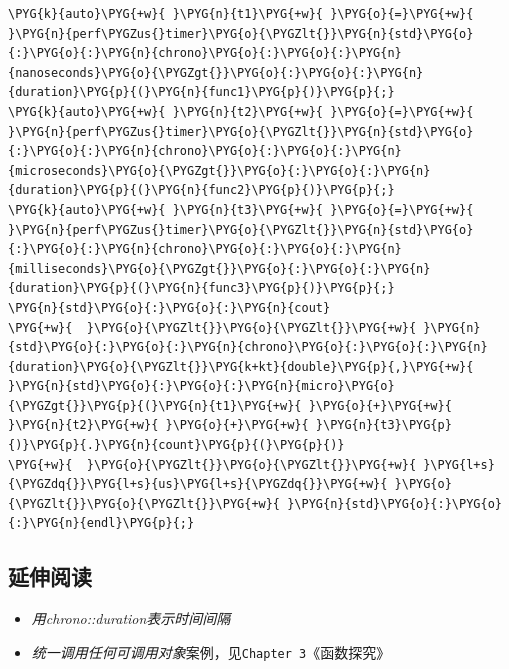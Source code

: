 \begin{codeblockbg}
\begin{Verbatim}[commandchars=\\\{\},breaklines=true,breakanywhere=true,fontsize=\codefont,xleftmargin=17bp]
\PYG{k}{auto}\PYG{+w}{ }\PYG{n}{t1}\PYG{+w}{ }\PYG{o}{=}\PYG{+w}{ }\PYG{n}{perf\PYGZus{}timer}\PYG{o}{\PYGZlt{}}\PYG{n}{std}\PYG{o}{:}\PYG{o}{:}\PYG{n}{chrono}\PYG{o}{:}\PYG{o}{:}\PYG{n}{nanoseconds}\PYG{o}{\PYGZgt{}}\PYG{o}{:}\PYG{o}{:}\PYG{n}{duration}\PYG{p}{(}\PYG{n}{func1}\PYG{p}{)}\PYG{p}{;}
\PYG{k}{auto}\PYG{+w}{ }\PYG{n}{t2}\PYG{+w}{ }\PYG{o}{=}\PYG{+w}{ }\PYG{n}{perf\PYGZus{}timer}\PYG{o}{\PYGZlt{}}\PYG{n}{std}\PYG{o}{:}\PYG{o}{:}\PYG{n}{chrono}\PYG{o}{:}\PYG{o}{:}\PYG{n}{microseconds}\PYG{o}{\PYGZgt{}}\PYG{o}{:}\PYG{o}{:}\PYG{n}{duration}\PYG{p}{(}\PYG{n}{func2}\PYG{p}{)}\PYG{p}{;}
\PYG{k}{auto}\PYG{+w}{ }\PYG{n}{t3}\PYG{+w}{ }\PYG{o}{=}\PYG{+w}{ }\PYG{n}{perf\PYGZus{}timer}\PYG{o}{\PYGZlt{}}\PYG{n}{std}\PYG{o}{:}\PYG{o}{:}\PYG{n}{chrono}\PYG{o}{:}\PYG{o}{:}\PYG{n}{milliseconds}\PYG{o}{\PYGZgt{}}\PYG{o}{:}\PYG{o}{:}\PYG{n}{duration}\PYG{p}{(}\PYG{n}{func3}\PYG{p}{)}\PYG{p}{;}
\PYG{n}{std}\PYG{o}{:}\PYG{o}{:}\PYG{n}{cout}
\PYG{+w}{  }\PYG{o}{\PYGZlt{}}\PYG{o}{\PYGZlt{}}\PYG{+w}{ }\PYG{n}{std}\PYG{o}{:}\PYG{o}{:}\PYG{n}{chrono}\PYG{o}{:}\PYG{o}{:}\PYG{n}{duration}\PYG{o}{\PYGZlt{}}\PYG{k+kt}{double}\PYG{p}{,}\PYG{+w}{ }\PYG{n}{std}\PYG{o}{:}\PYG{o}{:}\PYG{n}{micro}\PYG{o}{\PYGZgt{}}\PYG{p}{(}\PYG{n}{t1}\PYG{+w}{ }\PYG{o}{+}\PYG{+w}{ }\PYG{n}{t2}\PYG{+w}{ }\PYG{o}{+}\PYG{+w}{ }\PYG{n}{t3}\PYG{p}{)}\PYG{p}{.}\PYG{n}{count}\PYG{p}{(}\PYG{p}{)}
\PYG{+w}{  }\PYG{o}{\PYGZlt{}}\PYG{o}{\PYGZlt{}}\PYG{+w}{ }\PYG{l+s}{\PYGZdq{}}\PYG{l+s}{us}\PYG{l+s}{\PYGZdq{}}\PYG{+w}{ }\PYG{o}{\PYGZlt{}}\PYG{o}{\PYGZlt{}}\PYG{+w}{ }\PYG{n}{std}\PYG{o}{:}\PYG{o}{:}\PYG{n}{endl}\PYG{p}{;}
\end{Verbatim}
\end{codeblockbg}



\subsection{延伸阅读}



\begin{itemize}
\item \textit{用chrono::duration表示时间间隔}



\item \textit{统一调用任何可调用对象}案例，见\texttt{Chapter 3}《函数探究》

\end{itemize}


